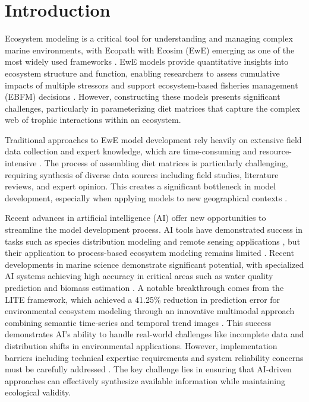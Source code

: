 \section{Introduction}

Ecosystem modeling is a critical tool for understanding and managing complex marine environments, with Ecopath with Ecosim (EwE) emerging as one of the most widely used frameworks \citep{Christensen2004, Colleter2015}. EwE models provide quantitative insights into ecosystem structure and function, enabling researchers to assess cumulative impacts of multiple stressors and support ecosystem-based fisheries management (EBFM) decisions \citep{Coll2015, Villasante2016}. However, constructing these models presents significant challenges, particularly in parameterizing diet matrices that capture the complex web of trophic interactions within an ecosystem.

Traditional approaches to EwE model development rely heavily on extensive field data collection and expert knowledge, which are time-consuming and resource-intensive \citep{Holden2024a}. The process of assembling diet matrices is particularly challenging, requiring synthesis of diverse data sources including field studies, literature reviews, and expert opinion. This creates a significant bottleneck in model development, especially when applying models to new geographical contexts \citep{Holden2024b}.

Recent advances in artificial intelligence (AI) offer new opportunities to streamline the model development process. AI tools have demonstrated success in tasks such as species distribution modeling and remote sensing applications \citep{Lapeyrolerie2022, Tuia2022}, but their application to process-based ecosystem modeling remains limited \citep{Karniadakis2021}. Recent developments in marine science demonstrate significant potential, with specialized AI systems achieving high accuracy in critical areas such as water quality prediction and biomass estimation \citep{Fernandes2024}. A notable breakthrough comes from the LITE framework, which achieved a 41.25\% reduction in prediction error for environmental ecosystem modeling through an innovative multimodal approach combining semantic time-series and temporal trend images \citep{Li2024}. This success demonstrates AI's ability to handle real-world challenges like incomplete data and distribution shifts in environmental applications. However, implementation barriers including technical expertise requirements and system reliability concerns must be carefully addressed \citep{Fernandes2024}. The key challenge lies in ensuring that AI-driven approaches can effectively synthesize available information while maintaining ecological validity.

